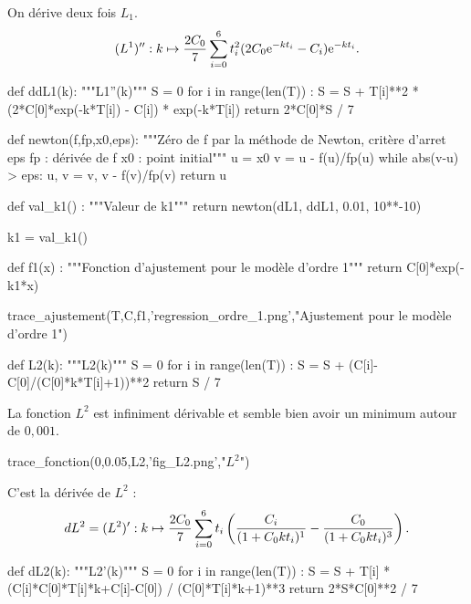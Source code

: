 \question{}
On dérive deux fois $L_1$.
\begin{equation*}
  (L^1)'' : k \mapsto \dfrac{2C_0}{7}\sum_{i=0}^6 t_i^2 (2C_0\mathrm{e}^{-kt_i}-C_i)\mathrm{e}^{-kt_i}.
\end{equation*}

\begin{pyverbatim}
def ddL1(k):
    """L1''(k)"""
    S = 0
    for i in range(len(T)) :
        S = S + T[i]**2 * (2*C[0]*exp(-k*T[i]) - C[i]) * exp(-k*T[i])
    return 2*C[0]*S / 7
\end{pyverbatim}

\question{}
\begin{pyverbatim}
def newton(f,fp,x0,eps):
    """Zéro de f par la méthode de Newton, critère d'arret eps
    fp : dérivée de f
    x0 : point initial"""
    u = x0
    v = u - f(u)/fp(u)
    while abs(v-u) > eps:
        u, v = v, v - f(v)/fp(v)
    return u
\end{pyverbatim}

\question{}
\begin{pyverbatim}
def val_k1() :
    """Valeur de k1"""
    return newton(dL1, ddL1, 0.01, 10**-10)

k1 = val_k1()
  
\end{pyverbatim}

\question{}
\begin{pyverbatim}
def f1(x) :
    """Fonction d'ajustement pour le modèle d'ordre 1"""
    return  C[0]*exp(-k1*x)

trace_ajustement(T,C,f1,'regression_ordre_1.png',"Ajustement pour le modèle d'ordre 1")
\end{pyverbatim}

\question{}
\begin{pyverbatim}
def L2(k):
    """L2(k)"""
    S = 0
    for i in range(len(T)) :
        S = S + (C[i]-C[0]/(C[0]*k*T[i]+1))**2
    return S / 7   
\end{pyverbatim}

\question{}
La fonction $L^2$ est infiniment dérivable et semble bien avoir un minimum autour de $0,001$.
\begin{pyverbatim}
trace_fonction(0,0.05,L2,'fig_L2.png',"$L^2$")
\end{pyverbatim}

\question{}
C'est la dérivée de $L^2$ : 
\begin{equation*}
  dL^2 = (L^2)' : k \mapsto \dfrac{2C_0}{7} \sum_{i=0}^6 t_i \left(  \dfrac{C_i}{(1+C_0kt_i)^1} -\dfrac{C_0}{(1+C_0kt_i)^3}\right).
\end{equation*}
\begin{pyverbatim}
def dL2(k):
    """L2'(k)"""
    S = 0
    for i in range(len(T)) :
        S = S + T[i] * (C[i]*C[0]*T[i]*k+C[i]-C[0]) / (C[0]*T[i]*k+1)**3
    return  2*S*C[0]**2 / 7 
\end{pyverbatim}


